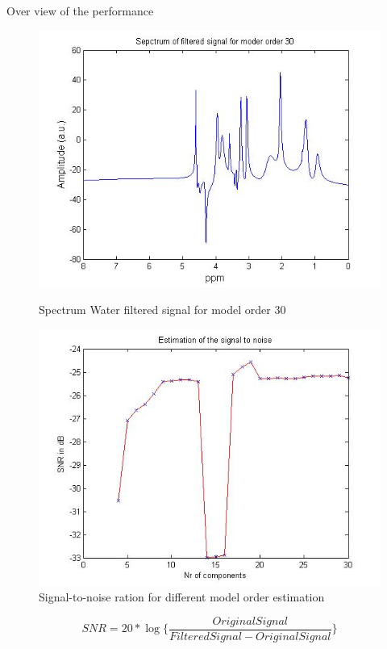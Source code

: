 \documentclass[t,12pt,english
\ifx\beamermode\undefined\else,\beamermode\fi
]{beamer}
\begin{document}
\begin{frame}{Over view of the performance}

\begin{figure}[!htbp]
%
\centering
\includegraphics[width=1\textwidth]{8_1.jpg}
\caption{\tiny Spectrum Water filtered signal for model order 30}\label{fig2}
\endminipage\hfill
{}%
\centering
\includegraphics[width=1\textwidth]{11.jpg}
\caption{\tiny Signal-to-noise ration for different model order estimation}\label{Nad1}
\endminipage\hfill
\end{figure}

\begin{equation}
SNR=20*\log\bigg\{\frac{OriginalSignal}{FilteredSignal-OriginalSignal}\bigg\}
\end{equation} 

\end{frame}
\end{document}

